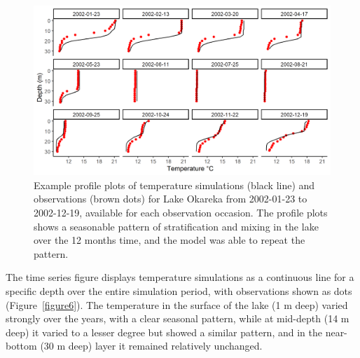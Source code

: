 \begin{figure}[htbp]
    \centering
    \includegraphics[scale=0.78]{Figure5.png}
    \caption{Example profile plots of temperature simulations (black line) and observations (brown dots) for Lake Okareka from 2002-01-23 to 2002-12-19, available for each observation occasion. The profile plots shows a seasonable pattern of stratification and mixing in the lake over the 12 months time, and the model was able to repeat the pattern.}
    \label{figure5}
\end{figure}

\newpage

The time series figure displays temperature simulations as a continuous line for a specific depth over the entire simulation period, with observations shown as dots (Figure~\ref{figure6}). The temperature in the surface of the lake (1 m deep) varied strongly over the years, with a clear seasonal pattern, while at mid-depth (14 m deep) it varied to a lesser degree but showed a similar pattern, and in the near-bottom (30 m deep) layer it remained relatively unchanged.\par

